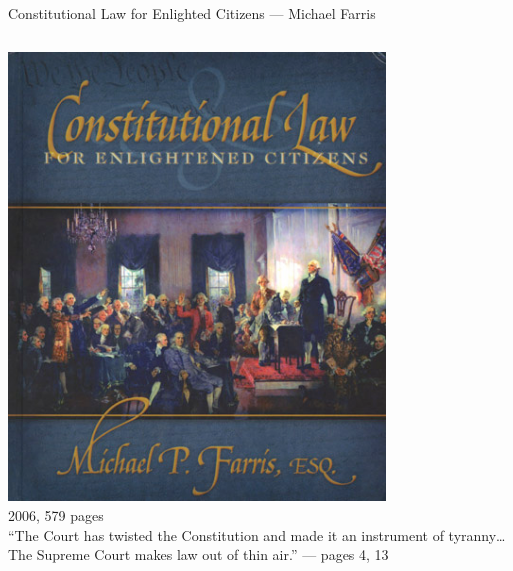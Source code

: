 \documentclass{beamer}
\begin{document}
\begin{frame}{Constitutional Law for Enlighted Citizens --- Michael Farris}
    \begin{columns}[onlytextwidth]
            \centering
            \includegraphics[width=0.75\textwidth]{img/constitutional-law.png} \\
            2006, 579 pages \\

            ``The Court has twisted the Constitution and made it an instrument of tyranny\ldots  The Supreme Court makes law out of thin air.'' --- pages 4, 13
    \end{columns}
\end{frame}
\end{document}
